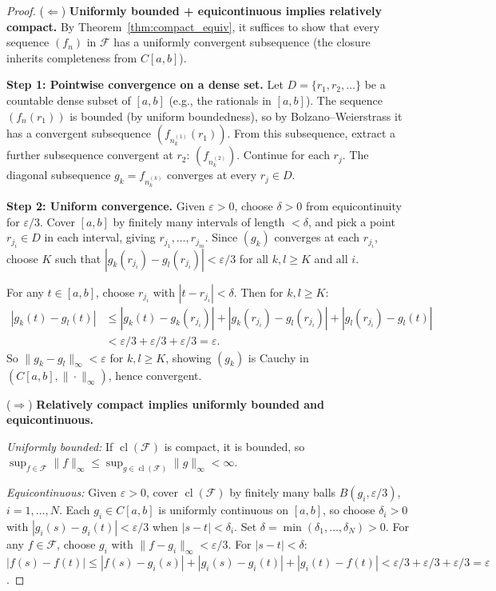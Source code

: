 \documentclass[11pt,a4paper]{article}
\theoremstyle{definition}
\theoremstyle{plain}
\theoremstyle{remark}
\DeclareMathOperator{\cl}{cl}
\begin{document}
\begin{proof}
($\Leftarrow$) \textbf{Uniformly bounded + equicontinuous implies relatively compact.}
By Theorem~\ref{thm:compact_equiv}, it suffices to show that every sequence $(f_n)$
in $\mathcal{F}$ has a uniformly convergent subsequence (the closure inherits
completeness from $C[a,b]$).

\textbf{Step 1: Pointwise convergence on a dense set.}
Let $D = \{r_1, r_2, \ldots\}$ be a countable dense subset of $[a,b]$ (e.g., the
rationals in $[a,b]$). The sequence $(f_n(r_1))$ is bounded (by uniform
boundedness), so by Bolzano--Weierstrass it has a convergent subsequence
$(f_{n_k^{(1)}}(r_1))$. From this subsequence, extract a further subsequence
convergent at $r_2$: $(f_{n_k^{(2)}})$. Continue for each $r_j$. The diagonal
subsequence $g_k = f_{n_k^{(k)}}$ converges at every $r_j \in D$.

\textbf{Step 2: Uniform convergence.}
Given $\varepsilon > 0$, choose $\delta > 0$ from equicontinuity for
$\varepsilon/3$. Cover $[a,b]$ by finitely many intervals of length $< \delta$, and
pick a point $r_{j_i} \in D$ in each interval, giving $r_{j_1}, \ldots, r_{j_m}$.
Since $(g_k)$ converges at each $r_{j_i}$, choose $K$ such that
$|g_k(r_{j_i}) - g_l(r_{j_i})| < \varepsilon/3$ for all $k, l \ge K$ and all $i$.

For any $t \in [a,b]$, choose $r_{j_i}$ with $|t - r_{j_i}| < \delta$. Then for
$k, l \ge K$:
\begin{align*}
|g_k(t) - g_l(t)| &\le |g_k(t) - g_k(r_{j_i})| + |g_k(r_{j_i}) - g_l(r_{j_i})|
+ |g_l(r_{j_i}) - g_l(t)| \\
&< \varepsilon/3 + \varepsilon/3 + \varepsilon/3 = \varepsilon.
\end{align*}
So $\|g_k - g_l\|_\infty < \varepsilon$ for $k, l \ge K$, showing $(g_k)$ is Cauchy
in $(C[a,b], \|\cdot\|_\infty)$, hence convergent.

($\Rightarrow$) \textbf{Relatively compact implies uniformly bounded and equicontinuous.}

\emph{Uniformly bounded:} If $\cl(\mathcal{F})$ is compact, it is bounded, so
$\sup_{f \in \mathcal{F}} \|f\|_\infty \le \sup_{g \in \cl(\mathcal{F})} \|g\|_\infty
< \infty$.

\emph{Equicontinuous:} Given $\varepsilon > 0$, cover $\cl(\mathcal{F})$ by finitely
many balls $B(g_i, \varepsilon/3)$, $i = 1, \ldots, N$. Each $g_i \in C[a,b]$ is
uniformly continuous on $[a,b]$, so choose $\delta_i > 0$ with
$|g_i(s) - g_i(t)| < \varepsilon/3$ when $|s-t| < \delta_i$. Set
$\delta = \min(\delta_1, \ldots, \delta_N) > 0$. For any $f \in \mathcal{F}$,
choose $g_i$ with $\|f - g_i\|_\infty < \varepsilon/3$. For $|s-t| < \delta$:
$|f(s) - f(t)| \le |f(s) - g_i(s)| + |g_i(s) - g_i(t)| + |g_i(t) - f(t)| <
\varepsilon/3 + \varepsilon/3 + \varepsilon/3 = \varepsilon$.
\end{proof}
\end{document}
